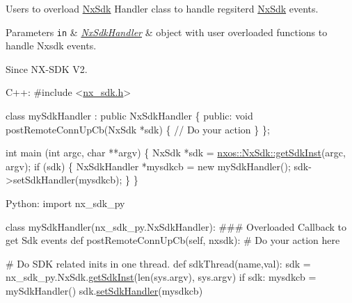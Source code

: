 Users to overload \mbox{\hyperlink{classnxos_1_1_nx_sdk}{Nx\+Sdk}} Handler class to handle regsiterd \mbox{\hyperlink{classnxos_1_1_nx_sdk}{Nx\+Sdk}} events. 
\begin{DoxyParams}[1]{Parameters}
\mbox{\tt in}  & {\em \mbox{\hyperlink{classnxos_1_1_nx_sdk_handler}{Nx\+Sdk\+Handler}}} & object with user overloaded functions to handle Nxsdk events.\\
\hline
\end{DoxyParams}
\begin{DoxySince}{Since}
N\+X-\/\+S\+DK V2. ~\newline
 
\begin{DoxyCode}
C++:
\textcolor{preprocessor}{   #include <\mbox{\hyperlink{nx__sdk_8h}{nx\_sdk.h}}>}

   \textcolor{keyword}{class }mySdkHandler : \textcolor{keyword}{public} NxSdkHandler \{
      \textcolor{keyword}{public}:
         \textcolor{keywordtype}{void} postRemoteConnUpCb(NxSdk *sdk) \{
              \textcolor{comment}{// Do your action}
         \}
   \};

   \textcolor{keywordtype}{int}  main (\textcolor{keywordtype}{int} argc, \textcolor{keywordtype}{char} **argv)
   \{
        NxSdk    *sdk = \mbox{\hyperlink{classnxos_1_1_nx_sdk_a5050e2d26c40744b4fc7862068a83f39}{nxos::NxSdk::getSdkInst}}(argc, argv);
        \textcolor{keywordflow}{if} (sdk) \{
            NxSdkHandler *mysdkcb = \textcolor{keyword}{new} mySdkHandler();
            sdk->setSdkHandler(mysdkcb);
        \}
   \}

Python:
   \textcolor{keyword}{import} nx\_sdk\_py

   \textcolor{keyword}{class }mySdkHandler(nx\_sdk\_py.NxSdkHandler):
\textcolor{preprocessor}{   ### Overloaded Callback to get Sdk events}
         def postRemoteConnUpCb(self, nxsdk):
\textcolor{preprocessor}{             # Do your action here}

\textcolor{preprocessor}{   # Do SDK related inits in one thread.}
   def sdkThread(name,val):
       sdk = nx\_sdk\_py.NxSdk.\mbox{\hyperlink{classnxos_1_1_nx_sdk_a5050e2d26c40744b4fc7862068a83f39}{getSdkInst}}(len(sys.argv), sys.argv)
       if sdk:
          mysdkcb = mySdkHandler()
          sdk.\mbox{\hyperlink{classnxos_1_1_nx_sdk_a5f14e71747eac4fd5703d0cb490abe89}{setSdkHandler}}(mysdkcb)
\end{DoxyCode}
 
\end{DoxySince}
\mbox{\label{classnxos_1_1_nx_sdk_a75ca70643fe325ddf0eea62c1f8c4cc8}} 
